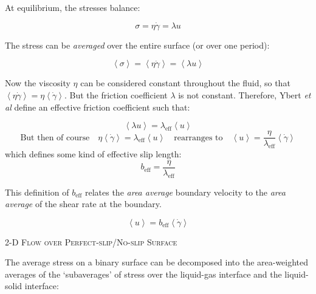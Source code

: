 \documentclass[a4paper]{report}
\newcommand{\beff}{\ensuremath{b_{\mathrm{eff}}}}
\begin{document}
At equilibrium, the stresses balance:

\begin{equation*}
\sigma = \eta \dot{\gamma} = \lambda u
\end{equation*}

The stress can be \emph{averaged} over the entire surface (or over one period):

\begin{equation*}
\left< \sigma \right> = \left< \eta \dot{\gamma} \right> = \left< \lambda u \right>
\end{equation*}

Now the viscosity $\eta$ can be considered constant throughout the fluid, so that $  \left< \eta \dot{\gamma} \right> = \eta \left< \dot{\gamma} \right> $.  But the friction coefficient $\lambda$ is not constant.  Therefore, Ybert \emph{et al} define an effective friction coefficient such that:

\begin{equation*}
\left< \lambda u \right> = \lambda_{\mathrm{eff}} \left< u \right>
\end{equation*}
\begin{equation*}
\text{But then of course} \quad
\eta \left< \dot{\gamma} \right> = \lambda_{\mathrm{eff}} \left< u \right>
\quad \text{rearranges to}  \quad
\left< u \right> = \frac{\eta}{ \lambda_{\mathrm{eff}} } \left< \dot{\gamma} \right> 
\end{equation*}
which defines some kind of effective slip length:
\begin{equation*}
\beff = \frac{\eta}{ \lambda_{\mathrm{eff}} }  
\end{equation*}

This definition of $\beff$ relates the \emph{area average} boundary velocity to the \emph{area average} of the shear rate at the boundary.

\begin{equation*}
\left< u \right> = \beff \left< \dot{\gamma} \right> 
\end{equation*}

\vspace*{1em}
\colorbox[gray]{0.8}{ \textsc{2-D Flow over Perfect-slip/No-slip Surface} }
\vspace{0.5em}

The average stress on a binary surface can be decomposed into the area-weighted averages of the `subaverages' of stress over the liquid-gas interface and the liquid-solid interface:
\end{document}
